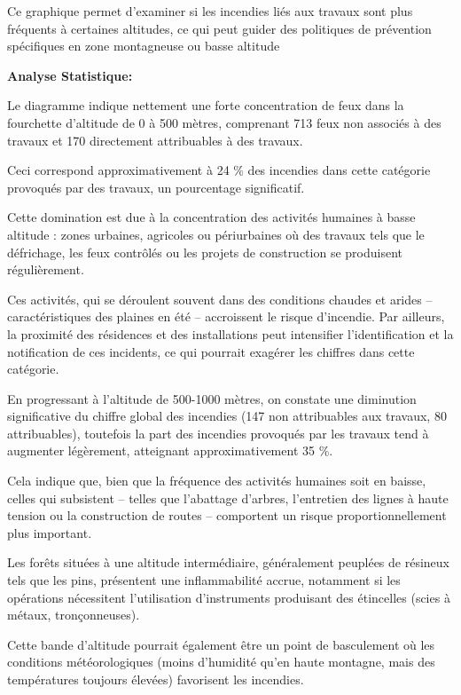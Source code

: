 \documentclass[
]{article}
\begin{document}
Ce graphique permet d'examiner si les incendies liés aux travaux sont
plus fréquents à certaines altitudes, ce qui peut guider des politiques
de prévention spécifiques en zone montagneuse ou basse altitude

\textbf{Analyse Statistique:}

Le diagramme indique nettement une forte concentration de feux dans la
fourchette d'altitude de 0 à 500 mètres, comprenant 713 feux non
associés à des travaux et 170 directement attribuables à des travaux.

Ceci correspond approximativement à 24 \% des incendies dans cette
catégorie provoqués par des travaux, un pourcentage significatif.

Cette domination est due à la concentration des activités humaines à
basse altitude : zones urbaines, agricoles ou périurbaines où des
travaux tels que le défrichage, les feux contrôlés ou les projets de
construction se produisent régulièrement.

Ces activités, qui se déroulent souvent dans des conditions chaudes et
arides -- caractéristiques des plaines en été -- accroissent le risque
d'incendie. Par ailleurs, la proximité des résidences et des
installations peut intensifier l'identification et la notification de
ces incidents, ce qui pourrait exagérer les chiffres dans cette
catégorie.

En progressant à l'altitude de 500-1000 mètres, on constate une
diminution significative du chiffre global des incendies (147 non
attribuables aux travaux, 80 attribuables), toutefois la part des
incendies provoqués par les travaux tend à augmenter légèrement,
atteignant approximativement 35 \%.

Cela indique que, bien que la fréquence des activités humaines soit en
baisse, celles qui subsistent -- telles que l'abattage d'arbres,
l'entretien des lignes à haute tension ou la construction de routes --
comportent un risque proportionnellement plus important.

Les forêts situées à une altitude intermédiaire, généralement peuplées
de résineux tels que les pins, présentent une inflammabilité accrue,
notamment si les opérations nécessitent l'utilisation d'instruments
produisant des étincelles (scies à métaux, tronçonneuses).

Cette bande d'altitude pourrait également être un point de basculement
où les conditions météorologiques (moins d'humidité qu'en haute
montagne, mais des températures toujours élevées) favorisent les
incendies.
\end{document}
